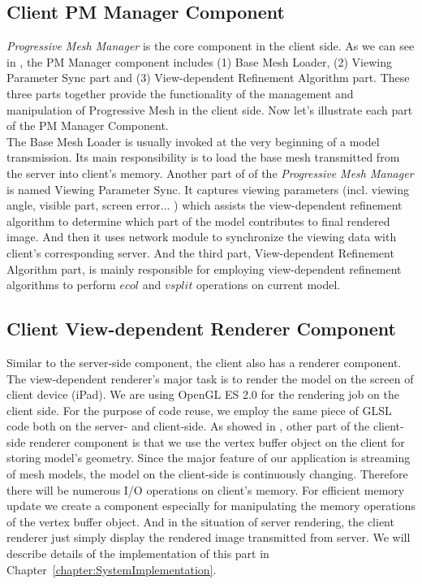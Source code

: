 \subsection{Client PM Manager Component}
\label{section:clientpmmcom}

\emph{Progressive Mesh Manager} is the core component in the client side. As we can see in , the PM Manager component includes (1) Base Mesh Loader, (2) Viewing Parameter Sync part and (3) View-dependent Refinement Algorithm part. These three parts together provide the functionality of the management and manipulation of Progressive Mesh in the client side. Now let's illustrate each part of the PM Manager Component. \\

The Base Mesh Loader is usually invoked at the very beginning of a model transmission. Its main responsibility is to load the base mesh transmitted from the server into client's memory.  Another part of of the \emph{Progressive Mesh Manager} is named Viewing Parameter Sync. It captures viewing parameters (incl. viewing angle, visible part, screen error... ) which assists the view-dependent refinement algorithm to determine which part of the model contributes to final rendered image. And then it uses network module to synchronize the viewing data with client's corresponding server. And the third part, View-dependent Refinement Algorithm part, is mainly responsible for employing view-dependent refinement algorithms to perform $ecol$ and $vsplit$ operations on current model. 


\subsection{Client View-dependent Renderer Component}
\label{section:clientvdrendercom}


Similar to the server-side component, the client also has a renderer component. The view-dependent renderer's major task is to render the model on the screen of client device (iPad). We are using OpenGL ES 2.0 for the rendering job on the client side. For the purpose of code reuse, we employ the same piece of GLSL code both on the server- and client-side. As showed in , other part of the client-side renderer component is that we use the vertex buffer object on the client for storing model's geometry. Since the major feature of our application is streaming of mesh models, the model on the client-side is continuously changing. Therefore there will be numerous I/O operations on client's memory. For efficient memory update we create a component especially for manipulating the memory operations of the vertex buffer object. And in the situation of server rendering, the client renderer just simply display the rendered image transmitted from server. We will describe details of the implementation of this part in Chapter~\ref{chapter:SystemImplementation}. 


